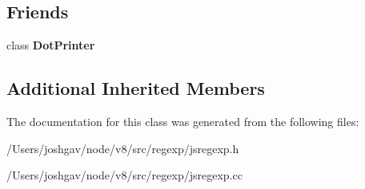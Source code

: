 \subsection*{Friends}
\begin{DoxyCompactItemize}
\item 
class {\bfseries Dot\+Printer}\hypertarget{classv8_1_1internal_1_1_action_node_a9c19d4d6fc300c029ba554cbe4d3d2e0}{}\label{classv8_1_1internal_1_1_action_node_a9c19d4d6fc300c029ba554cbe4d3d2e0}

\end{DoxyCompactItemize}
\subsection*{Additional Inherited Members}


The documentation for this class was generated from the following files\+:\begin{DoxyCompactItemize}
\item 
/\+Users/joshgav/node/v8/src/regexp/jsregexp.\+h\item 
/\+Users/joshgav/node/v8/src/regexp/jsregexp.\+cc\end{DoxyCompactItemize}
